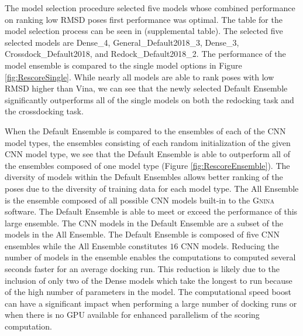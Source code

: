 \documentclass[journal=jcisd8,manuscript=article]{achemso}
\begin{document}
The model selection procedure selected five models whose combined performance on ranking low RMSD poses first performance was optimal. The table for the model selection process can be seen in (supplemental table). The selected five selected models are Dense\_4, General\_Default2018\_3, Dense\_3, Crossdock\_Default2018, and Redock\_Default2018\_2. The performance of the model ensemble is compared to the single model options in Figure \ref{fig:RescoreSingle}. While nearly all models are able to rank poses with low RMSD higher than Vina, we can see that the newly selected Default Ensemble significantly outperforms all of the single models on both the redocking task and the crossdocking task.  

When the Default Ensemble is compared to the ensembles of each of the CNN model types, the ensembles consisting of each random initialization of the given CNN model type, we see that the Default Ensemble is able to outperform all of the ensembles composed of one model type (Figure \ref{fig:RescoreEnsemble}). The diversity of models within the Default Ensembles allows better ranking of the poses due to the diversity of training data for each model type. The All Ensemble is the ensemble composed of all possible CNN models built-in to the \textsc{Gnina} software. The Default Ensemble is able to meet or exceed the performance of this large ensemble. The CNN models in the Default Ensemble are a subset of the models in the All Ensemble. The Default Ensemble is composed of five CNN ensembles while the All Ensemble constitutes $16$ CNN models. Reducing the number of models in the ensemble enables the computations to computed several seconds faster for an average docking run. This reduction is likely due to the inclusion of only two of the Dense models which take the longest to run because of the high number of parameters in the model. The computational speed boost can have a significant impact when performing a large number of docking runs or when there is no GPU available for enhanced parallelism of the scoring computation.
\end{document}
